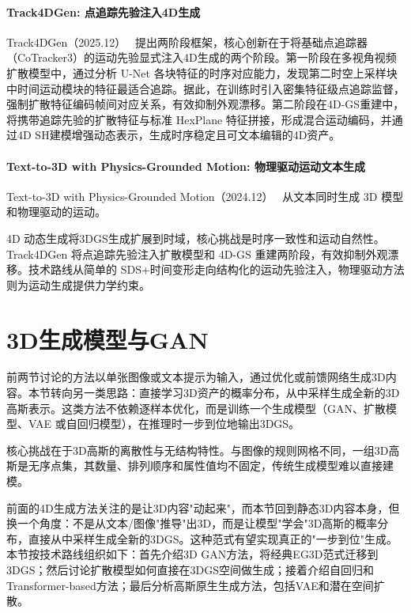 \paragraph{Track4DGen: 点追踪先验注入4D生成}

Track4DGen（2025.12）~\cite{2512_06158} 提出两阶段框架，核心创新在于将基础点追踪器（CoTracker3）的运动先验显式注入4D生成的两个阶段。第一阶段在多视角视频扩散模型中，通过分析 U-Net 各块特征的时序对应能力，发现第二时空上采样块中时间运动模块的特征最适合追踪。据此，在训练时引入密集特征级点追踪监督，强制扩散特征编码帧间对应关系，有效抑制外观漂移。第二阶段在4D-GS重建中，将携带追踪先验的扩散特征与标准 HexPlane 特征拼接，形成混合运动编码，并通过4D SH建模增强动态表示，生成时序稳定且可文本编辑的4D资产。

\paragraph{Text-to-3D with Physics-Grounded Motion: 物理驱动运动文本生成}

Text-to-3D with Physics-Grounded Motion（2024.12）~\cite{2412_05560} 从文本同时生成 3D 模型和物理驱动的运动。

\begin{takeaway}
4D 动态生成将3DGS生成扩展到时域，核心挑战是时序一致性和运动自然性。Track4DGen 将点追踪先验注入扩散模型和 4D-GS 重建两阶段，有效抑制外观漂移。技术路线从简单的 SDS+时间变形走向结构化的运动先验注入，物理驱动方法则为运动生成提供力学约束。
\end{takeaway}


\section{3D生成模型与GAN}
\label{sec:08_4}

前两节讨论的方法以单张图像或文本提示为输入，通过优化或前馈网络生成3D内容。本节转向另一类思路：直接学习3D资产的概率分布，从中采样生成全新的3D高斯表示。这类方法不依赖逐样本优化，而是训练一个生成模型（GAN、扩散模型、VAE 或自回归模型），在推理时一步到位地输出3DGS。

核心挑战在于3D高斯的离散性与无结构特性。与图像的规则网格不同，一组3D高斯是无序点集，其数量、排列顺序和属性值均不固定，传统生成模型难以直接建模。

前面的4D生成方法关注的是让3D内容"动起来"，而本节回到静态3D内容本身，但换一个角度：不是从文本/图像"推导"出3D，而是让模型"学会"3D高斯的概率分布，直接从中采样生成全新的3DGS。这种范式有望实现真正的"一步到位"生成。本节按技术路线组织如下：首先介绍3D GAN方法，将经典EG3D范式迁移到3DGS；然后讨论扩散模型如何直接在3DGS空间做生成；接着介绍自回归和Transformer-based方法；最后分析高斯原生生成方法，包括VAE和潜在空间扩散。

